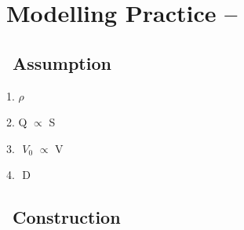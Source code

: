 \documentclass{article}
\newcommand{\unicode}[1]{{}}
\begin{document}
\section*{Modelling Practice --$\unicode{5bf9}\unicode{4e8e}\unicode{52a8}\unicode{7269}\unicode{4f53}\unicode{91cd}\unicode{548c}\unicode{5fc3}\unicode{7387}\unicode{5173}\unicode{7cfb}\unicode{7684}\unicode{5efa}\unicode{6a21}$}

\subsection*{$\unicode{5efa}\unicode{6a21}\unicode{5047}\unicode{8bbe}$ Assumption$\unicode{ff1a}$}

1. $\unicode{54fa}\unicode{4e73}\unicode{52a8}\unicode{7269}\unicode{8eab}\unicode{4f53}\unicode{5316}\unicode{5b66}\unicode{6210}\unicode{5206}\unicode{76f8}\unicode{4f3c}\unicode{ff0c}\unicode{5373}\unicode{5bc6}\unicode{5ea6}\rho
\unicode{76f8}\unicode{540c}\unicode{3002}$

2. $\unicode{5355}\unicode{4f4d}\unicode{65f6}\unicode{95f4}\unicode{6563}\unicode{5931}\unicode{70ed}\unicode{91cf}\unicode{4e0e}\unicode{8be5}\unicode{7269}\unicode{79cd}\unicode{76ae}\unicode{80a4}\unicode{9762}\unicode{79ef}\unicode{6210}\unicode{6b63}\unicode{6bd4}\unicode{ff0c}$Q
$\propto $ S$\unicode{3002}$

3. $\unicode{54fa}\unicode{4e73}\unicode{52a8}\unicode{7269}\unicode{5fc3}\unicode{5ba4}\unicode{5bb9}\unicode{79ef}\unicode{548c}\unicode{8be5}\unicode{54fa}\unicode{4e73}\unicode{52a8}\unicode{7269}\unicode{4f53}\unicode{79ef}\unicode{6210}\unicode{6b63}\unicode{6bd4}\unicode{ff0c}\unicode{5373}$
\(V_0\) $\propto $ V$\unicode{3002}$

4. $\unicode{5355}\unicode{4f4d}\unicode{4f53}\unicode{79ef}\unicode{8840}\unicode{6db2}\unicode{643a}\unicode{5e26}\unicode{80fd}\unicode{91cf}\unicode{76f8}\unicode{540c}\unicode{ff0c}\unicode{4e3a}$
D$\unicode{3002}$

\subsection*{$\unicode{6a21}\unicode{578b}\unicode{5efa}\unicode{7acb}$ Construction$\unicode{ff1a}$}
\end{document}
